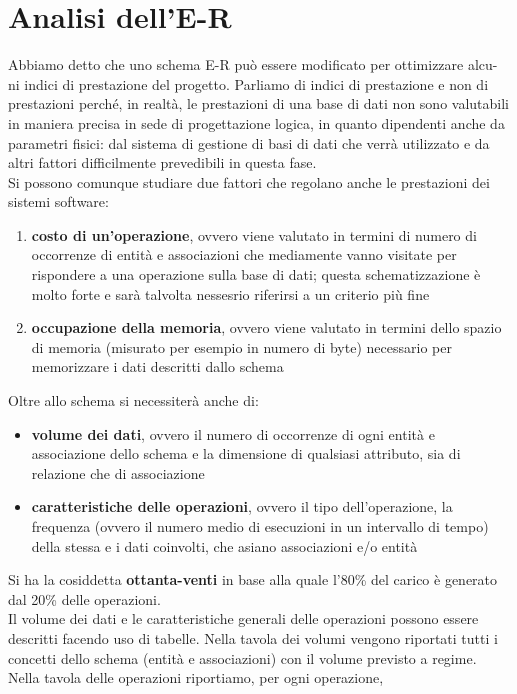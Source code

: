 \documentclass[a4paper,12pt, oneside]{book}
\begin{document}
\section{Analisi dell'E-R}
Abbiamo detto che uno schema E-R può essere modificato per ottimizzare alcu-
ni indici di prestazione del progetto. Parliamo di indici di prestazione e non di
prestazioni perché, in realtà, le prestazioni di una base di dati non sono valutabili
in maniera precisa in sede di progettazione logica, in quanto dipendenti anche da
parametri fisici: dal sistema di gestione di basi di dati che verrà utilizzato e da
altri fattori difficilmente prevedibili in questa fase.
\\Si possono comunque studiare due fattori che regolano anche le prestazioni dei sistemi software:
\begin{enumerate}
\item \textbf{costo di un'operazione}, ovvero viene valutato in termini di numero di occorrenze
di entità e associazioni che mediamente vanno visitate per rispondere a una
operazione sulla base di dati; questa schematizzazione è molto forte e sarà
talvolta nessesrio riferirsi a un criterio più fine
\item \textbf{occupazione della memoria}, ovvero viene valutato in termini dello spazio di memoria
(misurato per esempio in numero di byte) necessario per memorizzare i dati
descritti dallo schema
\end{enumerate}
Oltre allo schema si necessiterà anche di:
\begin{itemize}
\item \textbf{volume dei dati}, ovvero il numero di occorrenze di ogni entità e associazione
  dello schema e la dimensione di qualsiasi attributo, sia di relazione che di associazione
\item \textbf{caratteristiche delle operazioni}, ovvero il tipo dell'operazione,
  la frequenza (ovvero il numero medio di esecuzioni in un intervallo di tempo)
  della stessa e i dati coinvolti, che asiano associazioni e/o entità
\end{itemize}
Si ha la cosiddetta \textbf{ottanta-venti} in base alla quale l'80\% del carico è generato dal 20\%  delle operazioni.\\
Il volume dei dati e le caratteristiche generali delle operazioni possono essere
descritti facendo uso di tabelle. Nella tavola dei volumi
vengono riportati tutti i concetti dello schema (entità e associazioni) con il volume previsto a regime. Nella tavola delle operazioni riportiamo, per ogni operazione,
\end{document}
